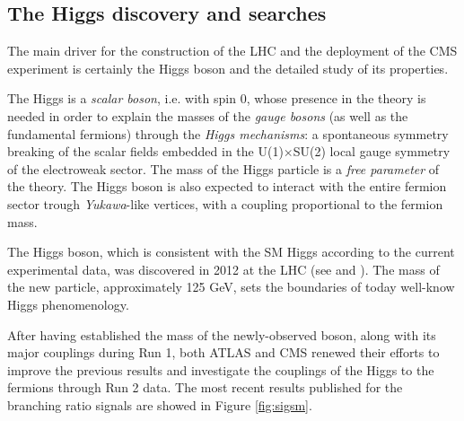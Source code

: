 \subsection{The Higgs discovery and searches}

The main driver for the construction of the LHC and the deployment of the CMS experiment is certainly the Higgs boson and the detailed study of its properties. 

The Higgs is a \emph{scalar boson}, i.e. with spin $0$, whose presence in the theory is needed in order to explain the masses of the \emph{gauge bosons} (as well as the fundamental fermions) through the \emph{Higgs mechanisms}: a spontaneous symmetry breaking of the scalar fields embedded in the U(1)$\times$SU(2) local gauge symmetry of the electroweak sector. The mass of the Higgs particle is a \emph{free parameter} of the theory. The Higgs boson is also expected to  interact with the entire fermion sector trough \emph{Yukawa}-like vertices, with a coupling proportional to the fermion mass.

The Higgs boson, which is consistent with the SM Higgs according to the current experimental data, was discovered in 2012 at the LHC (see \cite{Aad_2012} and \cite{Chatrchyan_2012}). The mass of the new particle, approximately 125 GeV, sets the boundaries of today well-know Higgs phenomenology.

After having established the mass of the newly-observed boson, along with its major couplings during Run 1, both ATLAS and CMS renewed their efforts to improve the previous results and investigate the couplings of the Higgs to the fermions through Run 2 data. The most recent results published for the branching ratio signals are showed in Figure \ref{fig:sigsm}.

